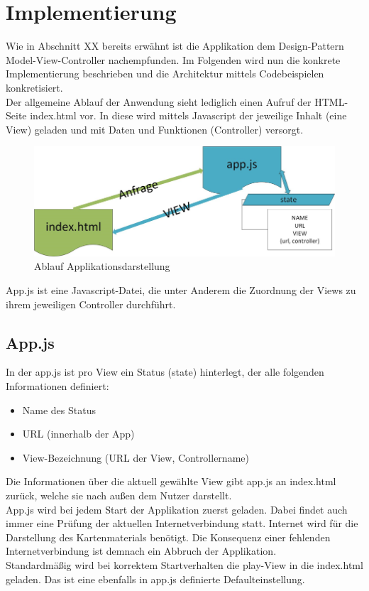 \newpage
\section{Implementierung}
Wie in Abschnitt XX bereits erwähnt ist die Applikation dem Design-Pattern Model-View-Controller nachempfunden. Im Folgenden wird nun die konkrete Implementierung beschrieben und die Architektur mittels Codebeispielen konkretisiert.
\\
Der allgemeine Ablauf der Anwendung sieht lediglich einen Aufruf der HTML-Seite index.html vor. In diese wird mittels Javascript der jeweilige Inhalt (eine View) geladen und mit Daten und Funktionen (Controller) versorgt.
\begin{figure}[h]
\centering
\includegraphics[width=1\textwidth]{ref/images/index.png}
\caption[Ablauf Applikationsdarstellung]{Ablauf Applikationsdarstellung}
\label{fig:HTML-Darstellung}
\end{figure}

App.js ist eine Javascript-Datei, die unter Anderem die Zuordnung der Views zu ihrem jeweiligen Controller durchführt. 
\subsection{App.js}
In der app.js ist pro View ein Status (state) hinterlegt, der alle folgenden Informationen definiert:
\begin{itemize}
\item Name des Status
\item URL (innerhalb der App)
\item View-Bezeichnung (URL der View, Controllername)
\end{itemize}
Die Informationen über die aktuell gewählte View gibt app.js an index.html zurück, welche sie nach außen dem Nutzer darstellt.
\\
App.js wird bei jedem Start der Applikation zuerst geladen. Dabei findet auch immer eine Prüfung der aktuellen Internetverbindung statt. Internet wird für die Darstellung des Kartenmaterials benötigt. Die Konsequenz einer fehlenden Internetverbindung ist demnach ein Abbruch der Applikation.
\\
Standardmäßig wird bei korrektem Startverhalten die play-View in die index.html geladen. Das ist eine ebenfalls in app.js definierte Defaulteinstellung.
\\
